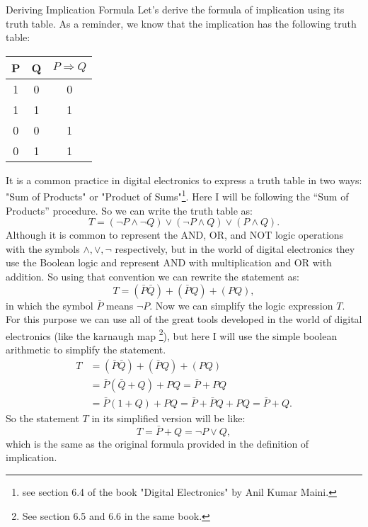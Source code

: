\begin{example}{Deriving Implication Formula}
	Let's derive the formula of implication using its truth table. As a reminder, we know that the implication has the following truth table:
		\begin{center}
		\begin{tabular}{|c|c|c|}
			\hline
			P & Q & $ P \Rightarrow Q $ \\
			\hline
			1 & 0 & 0 \\
			\hline
			1 & 1 & 1 \\
			\hline
			0 & 0 & 1 \\
			\hline
			0 & 1 & 1 \\
			\hline
		\end{tabular}
	\end{center}

	It is a common practice in digital electronics to express a truth table in two ways: "Sum of Products" or "Product of Sums"\footnote{see  section 6.4 of the book "Digital Electronics" by Anil Kumar Maini.}. Here I will be following the ``Sum of Products'' procedure. So we can write the truth table as:
	\[ T = (\neg P \wedge \neg Q) \vee (\neg P \wedge Q) \vee (P \wedge Q). \]
	Although it is common to represent the AND, OR, and NOT logic operations with the symbols $ \wedge, \vee, \neg $ respectively, but in the world of digital electronics they use the Boolean logic and represent AND with multiplication and OR with addition. So using that convention we can rewrite the statement as:
	\[ T = (\bar{P}  \bar{Q}) + (\bar{P}  Q) + (P  Q), \]
	in which the symbol $ \bar{P} $ means $ \neg P $. Now we can simplify the logic expression $ T $. For this purpose we can use all of the great tools developed in the world of digital electronics (like the karnaugh map \footnote{See section 6.5 and 6.6 in the same book.}), but here I will use the simple boolean arithmetic to simplify the statement. 
	\begin{align*}
		T & = (\bar{P}  \bar{Q}) + (\bar{P}  Q) + (P  Q) \\
		& = \bar{P} (\bar{Q} + Q) + PQ = \bar{P} + PQ \\
		& = \bar{P} (1 + Q) + PQ = \bar{P} + \bar{P}Q + PQ = \bar{P} + Q. 
	\end{align*}
	So the statement $ T $ in its simplified version will be like:
	\[ T = \bar{P} + Q = \neg P \vee Q, \]
	which is the same as the original formula provided in the definition of implication.
\end{example}

